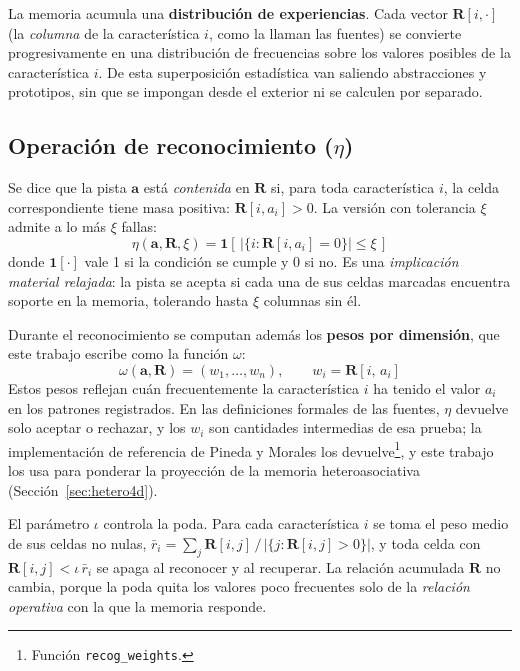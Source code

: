 La memoria acumula una \textbf{distribución de experiencias}.
Cada vector $\mathbf{R}[i, \cdot]$ (la \emph{columna} de la característica $i$, como la
llaman las fuentes) se convierte progresivamente en una distribución de
frecuencias sobre los valores posibles de la característica $i$.
De esta superposición estadística van saliendo abstracciones y prototipos, sin que se
impongan desde el exterior ni se calculen por separado.

\subsection*{Operación de reconocimiento ($\eta$)}

Se dice que la pista $\mathbf{a}$ está \emph{contenida} en $\mathbf{R}$ si, para toda
característica $i$, la celda correspondiente tiene masa positiva: $\mathbf{R}[i, a_i] > 0$.
La versión con tolerancia $\xi$ admite a lo más $\xi$ fallas:
\begin{equation}
    \eta(\mathbf{a}, \mathbf{R}, \xi) = \mathbf{1}\!\left[\,\bigl|\{i : \mathbf{R}[i, a_i] = 0\}\bigr| \leq \xi\,\right]
    \label{eq:reconocimiento}
\end{equation}
donde $\mathbf{1}[\cdot]$ vale 1 si la condición se cumple y 0 si no.
Es una \emph{implicación material relajada}: la pista se acepta si cada una de sus
celdas marcadas encuentra soporte en la memoria, tolerando hasta $\xi$ columnas sin él.

Durante el reconocimiento se computan además los \textbf{pesos por dimensión}, que este
trabajo escribe como la función $\omega$:
\begin{equation}
    \omega(\mathbf{a}, \mathbf{R}) = (w_1, \ldots, w_n), \qquad w_i = \mathbf{R}[i,\, a_i]
    \label{eq:pesos}
\end{equation}
Estos pesos reflejan cuán frecuentemente la característica $i$ ha tenido el valor $a_i$
en los patrones registrados.
En las definiciones formales de las fuentes, $\eta$ devuelve solo aceptar o rechazar, y
los $w_i$ son cantidades intermedias de esa prueba; la implementación de referencia de
Pineda y Morales los devuelve\footnote{Función \texttt{recog\_weights}.}, y este
trabajo los usa para ponderar la proyección de la memoria heteroasociativa (Sección~\ref{sec:hetero4d}).

El parámetro $\iota$ controla la poda.
Para cada característica $i$ se toma el peso medio de sus celdas no nulas,
$\bar{r}_i = \sum_j \mathbf{R}[i,j] \,/\, |\{j : \mathbf{R}[i,j] > 0\}|$, y toda celda
con $\mathbf{R}[i,j] < \iota\,\bar{r}_i$ se apaga al reconocer y al recuperar.
La relación acumulada $\mathbf{R}$ no cambia, porque la poda quita los valores poco
frecuentes solo de la \emph{relación operativa} con la que la memoria responde.

